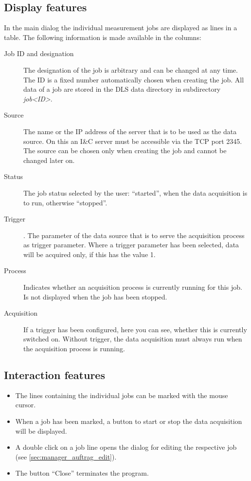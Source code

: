 \documentclass[a4paper,12pt,BCOR6mm,bibtotoc,idxtotoc]{scrbook}
\begin{document}

\subsection{Display features}

In the main dialog the individual measurement jobs are
displayed as lines in a table. The following information is made available in
the columns:

\begin{description}
\item[Job ID and designation] The designation of the job is arbitrary and can be changed at any time. The ID is a fixed number automatically chosen when creating the job. All data of a job are stored in the DLS data directory in subdirectory \textit{job\textless ID\textgreater}.
\item[Source] The name or the IP address of the server that is to be
  used as the data source. On this an I\&C server must be accessible
  via the TCP port 2345. The source can be chosen only when creating
  the job and cannot be changed later on.
\item[Status] The job status selected by the user: ``started'', when the data acquisition is to run, otherwise ``stopped''.
\item[Trigger]. The parameter of the data source that is to serve the acquisition process as trigger parameter. Where a trigger parameter has been selected, data will be acquired only, if this has the value 1.
\item[Process] Indicates whether an acquisition process is currently running for this job. Is not displayed when the job has been stopped.
\item[Acquisition] If a trigger has been configured, here you can see, whether this is currently switched on. Without trigger, the data acquisition must always run when the acquisition process is running. \end{description}


\subsection{Interaction features}

\begin{itemize}

\item The lines containing the individual jobs can be marked with the mouse
cursor.

\item When a job has been marked, a button to start or stop the data
acquisition will be displayed.

\item A double click on a job line opens the dialog for editing the respective
job (see \autoref{sec:manager_auftrag_edit}).

\item The button ``Close'' terminates the program.

\end{itemize}
\end{document}
